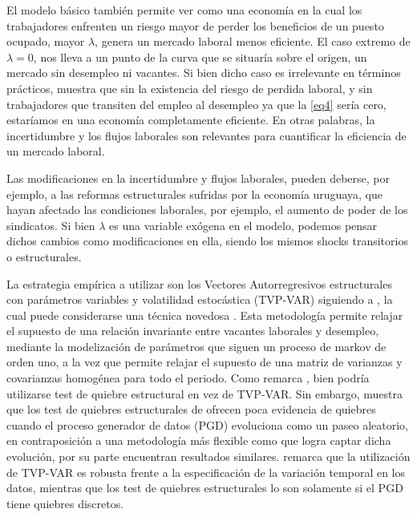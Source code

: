 El modelo básico también permite ver como una economía en la cual los trabajadores enfrenten un riesgo mayor de perder los beneficios de un puesto ocupado, mayor $\lambda$, genera un mercado laboral menos eficiente. El caso extremo de $\lambda=0$, nos lleva a un punto de la curva que se situaría sobre el origen, un mercado sin desempleo ni vacantes. Si bien dicho caso es irrelevante en términos prácticos, muestra que sin la existencia del riesgo de perdida laboral, y sin trabajadores que transiten del empleo al desempleo ya que la \eqref{eq4} sería cero, estaríamos en una economía completamente eficiente. En otras palabras, la incertidumbre y los flujos laborales son relevantes para cuantificar la eficiencia de un mercado laboral.

Las modificaciones en la incertidumbre y flujos laborales, pueden deberse, por ejemplo, a las reformas estructurales sufridas por la economía uruguaya, que hayan afectado las condiciones laborales, por ejemplo, el aumento de poder de los sindicatos. Si bien $\lambda$ es una variable exógena en el modelo, podemos pensar dichos cambios como modificaciones en ella, siendo los mismos shocks transitorios o estructurales.



La estrategia empírica a utilizar son los Vectores Autorregresivos estructurales con parámetros variables y volatilidad estocástica (TVP-VAR) siguiendo a \cite{Nakajima2011, Primiceri2005, Lubik2016b}, la cual puede considerarse una técnica novedosa \cite{Craven2014}. Esta metodología permite relajar el supuesto de una relación invariante entre vacantes laborales y desempleo, mediante la modelización de parámetros que siguen un proceso de markov de orden uno, a la vez que permite relajar el supuesto de una matriz de varianzas y covarianzas homogénea para todo el periodo. Como remarca \cite{Benati2013}, bien podría utilizarse test de quiebre estructural en vez de TVP-VAR. Sin embargo, \cite{Benati2007} muestra que los test de quiebres estructurales de \cite{BaiPerron1998, BaiPerron2003, Bai1997} ofrecen poca evidencia de quiebres cuando el proceso generador de datos (PGD) evoluciona como un paseo aleatorio, en contraposición a una metodología más flexible como \cite{Stock1996, Stock1998} que logra captar dicha evolución, por su parte \cite{Cogley2005} encuentran resultados similares. \cite{Benati2013} remarca que la utilización de TVP-VAR es robusta frente a la especificación de la variación temporal en los datos, mientras que los test de quiebres estructurales lo son solamente si el PGD tiene quiebres discretos.

